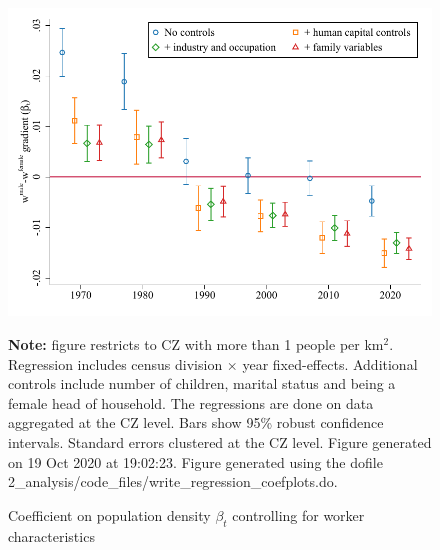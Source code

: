 \begin{figure}[!h]
\centering
\caption{Coefficient on population density $ \beta_t $ controlling for worker characteristics}
\includegraphics[width=.6\textwidth]{../2_analysis/output/figures/with_control_gradients_individual_l_czone_density_full_time}
\par \begin{minipage}[h]{\textwidth}{\tiny\textbf{Note:} figure restricts to CZ with more than 1 people per km$^2$. Regression includes census division $\times $ year fixed-effects. Additional controls include number of children, marital status and being a female head of household. The regressions are done on data aggregated at the CZ level. Bars show 95\% robust confidence intervals. Standard errors clustered at the CZ level. Figure generated on 19 Oct 2020 at 19:02:23. Figure generated using the dofile 2\_analysis/code\_files/write\_regression\_coefplots.do.}\end{minipage}
\end{figure}
